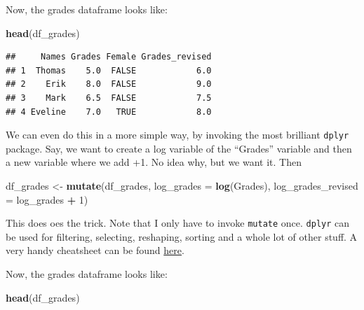 \documentclass[]{article}
\newenvironment{Shaded}{\begin{snugshade}}{\end{snugshade}}
\newcommand{\KeywordTok}[1]{\textcolor[rgb]{0.13,0.29,0.53}{\textbf{#1}}}
\newcommand{\DataTypeTok}[1]{\textcolor[rgb]{0.13,0.29,0.53}{#1}}
\newcommand{\DecValTok}[1]{\textcolor[rgb]{0.00,0.00,0.81}{#1}}
\newcommand{\StringTok}[1]{\textcolor[rgb]{0.31,0.60,0.02}{#1}}
\newcommand{\OperatorTok}[1]{\textcolor[rgb]{0.81,0.36,0.00}{\textbf{#1}}}
\newcommand{\NormalTok}[1]{#1}
\theoremstyle{definition}
\theoremstyle{definition}
\theoremstyle{definition}
\theoremstyle{remark}
\begin{document}
\begin{Shaded}
\end{Shaded}

Now, the grades dataframe looks like:

\begin{Shaded}
\begin{Highlighting}[]
\KeywordTok{head}\NormalTok{(df_grades)}
\end{Highlighting}
\end{Shaded}

\begin{verbatim}
##     Names Grades Female Grades_revised
## 1  Thomas    5.0  FALSE            6.0
## 2    Erik    8.0  FALSE            9.0
## 3    Mark    6.5  FALSE            7.5
## 4 Eveline    7.0   TRUE            8.0
\end{verbatim}

We can even do this in a more simple way, by invoking the most brilliant
\texttt{dplyr} package. Say, we want to create a log variable of the
``Grades'' variable and then a new variable where we add +1. No idea
why, but we want it. Then

\begin{Shaded}
\begin{Highlighting}[]
\NormalTok{df_grades <-}\StringTok{ }\KeywordTok{mutate}\NormalTok{(df_grades, }
               \DataTypeTok{log_grades =} \KeywordTok{log}\NormalTok{(Grades),}
               \DataTypeTok{log_grades_revised =}\NormalTok{ log_grades }\OperatorTok{+}\StringTok{ }\DecValTok{1}\NormalTok{)}
\end{Highlighting}
\end{Shaded}

This does oes the trick. Note that I only have to invoke \texttt{mutate}
once. \texttt{dplyr} can be used for filtering, selecting, reshaping,
sorting and a whole lot of other stuff. A very handy cheatsheet can be
found
\href{https://www.rstudio.com/wp-content/uploads/2015/02/data-wrangling-cheatsheet.pdf}{here}.

Now, the grades dataframe looks like:

\begin{Shaded}
\begin{Highlighting}[]
\KeywordTok{head}\NormalTok{(df_grades)}
\end{Highlighting}
\end{Shaded}
\end{document}
